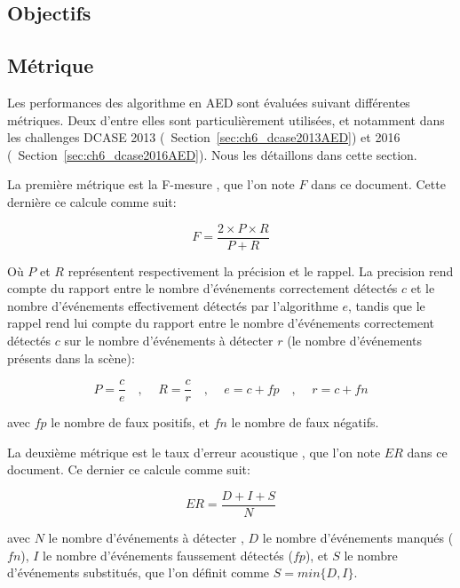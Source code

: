 \subsection{Objectifs}
\label{sec:ch6_objAED}


\subsection{Métrique}
\label{sec:ch6_metriqueAED}

Les performances des algorithme en AED sont évaluées suivant différentes métriques. Deux d'entre elles sont particulièrement utilisées, et notamment dans les challenges DCASE 2013 (\cf~Section~\ref{sec:ch6_dcase2013AED}) et 2016 (\cf~Section~\ref{sec:ch6_dcase2016AED}). Nous les détaillons dans cette section.

La première métrique est la F-mesure \citep{Giannoulis:2013a,Stowell15}, que l'on note $F$ dans ce document. Cette dernière ce calcule comme suit:

\begin{equation}
F=\dfrac{2\times P \times R}{P+R}
\end{equation}

Où $P$ et $R$ représentent respectivement la précision et le rappel. La precision rend compte du rapport entre le nombre d'événements correctement détectés $c$ et le nombre d'événements effectivement détectés par l'algorithme $e$, tandis que le rappel rend lui compte du rapport entre le nombre d'événements correctement détectés $c$ sur le nombre d'événements à détecter $r$ (le nombre d'événements présents dans la scène):

\begin{equation}
P=\dfrac{c}{e}  \quad \textrm{, } \quad R=\dfrac{c}{r} \quad \textrm{, } \quad  e=c+fp \quad \textrm{, } \quad  r=c+fn
\end{equation}

avec $fp$ le nombre de faux positifs, et $fn$ le nombre de faux négatifs.


La deuxième métrique est le taux d'erreur acoustique \citep{poliner2007discriminative,clear}, que l'on note $ER$ dans ce document. Ce dernier ce calcule comme suit:

\begin{equation}
ER=\dfrac{D+I+S}{N}
\end{equation}

avec $N$ le nombre d'événements à détecter , $D$ le nombre d'événements manqués ($fn$), $I$ le nombre d'événements faussement détectés ($fp$), et $S$ le nombre d'événements substitués, que l'on définit comme $S=min\lbrace D,I\rbrace$.

